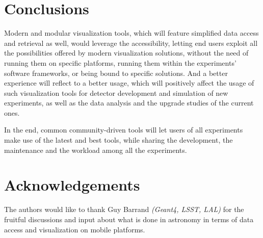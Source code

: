 \documentclass[12pt,a4paper]{article}
\begin{document}
\hypertarget{conclusions}{%
\section{Conclusions}\label{conclusions}}

Modern and modular visualization tools, which will feature simplified data access and retrieval as well, would leverage
the accessibility, letting end users exploit all the possibilities offered by modern visualization solutions, without the need
of running them on specific platforms, running them within the experiments’ software frameworks, or being bound to specific solutions.
And a better experience will reflect to a better usage, which will positively affect the usage of such visualization tools for
detector development and simulation of new experiments, as well as the data analysis and the upgrade studies of the current ones.

In the end, common community-driven tools will let users of all experiments make use of the latest and best tools, while sharing the development,
the maintenance and the workload among all the experiments.

\hypertarget{acknowledgements}{%
\section{Acknowledgements}\label{acknowledgements}}

The authors would like to thank Guy Barrand \textit{(Geant4, LSST, LAL)} for the fruitful discussions and input about what is done in astronomy in terms of data access and visualization on mobile platforms.



\sloppy
\raggedright
\clearpage
\printbibliography[title={References},heading=bibintoc]
\end{document}
